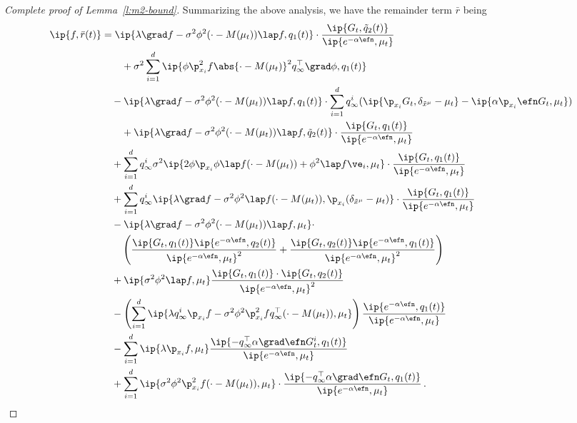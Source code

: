 \documentclass{amsart}
\begin{document}
\begin{proof}[Complete proof of Lemma~\ref{l:m2-bound}]
	Summarizing the above analysis, we have the remainder term $\bar r$ being 
	\begin{align*}
		\ip{f, \bar r(t)} & = \ip{\lambda \grad f - \sigma^2 \phi^2 (\cdot-M(\mu_t)) \lap f, q_1(t)} \cdot \frac{\ip{G_t, \tilde q_2(t)}}{\ip{e^{-\alpha\efn}, \mu_t}} \\
		& \qquad + \sigma^2 \sum_{i=1}^d \ip{\phi \p_{x_i}^2 f \abs{\cdot-M(\mu_t)}^2 q_\infty^\top \grad \phi, q_1(t)} \\
		& \quad - \ip{\lambda \grad f - \sigma^2 \phi^2 (\cdot-M(\mu_t)) \lap f, q_1(t)} \cdot \sum_{i=1}^d q_\infty^i (\ip{\p_{x_i} G_t, \delta_{\tilde x^\mu} - \mu_t} - \ip{\alpha \p_{x_i} \efn G_t, \mu_t})  \\
		& \qquad + \ip{\lambda \grad f - \sigma^2 \phi^2 (\cdot-M(\mu_t)) \lap f, \tilde q_2(t)} \cdot \frac{\ip{G_t, q_1(t)}}{\ip{e^{-\alpha\efn}, \mu_t}} \\
		& \quad + \sum_{i=1}^d q_\infty^i \sigma^2 \ip{ 2 \phi \p_{x_i} \phi \lap f (\cdot-M(\mu_t)) + \phi^2 \lap f \ve_i, \mu_t } \cdot \frac{\ip{G_t, q_1(t)}}{\ip{e^{-\alpha\efn}, \mu_t}} \\
		& \quad + \sum_{i=1}^d q_\infty^i \ip{\lambda \grad f - \sigma^2 \phi^2 \lap f (\cdot-M(\mu_t)), \p_{x_i} (\delta_{\tilde x^\mu} - \mu_t)} \cdot \frac{\ip{G_t, q_1(t)}}{\ip{e^{-\alpha\efn}, \mu_t}} \\
		& \quad - \ip {\lambda \grad f - \sigma^2 \phi^2 (\cdot-M(\mu_t)) \lap f, \mu_t} \cdot \\ 
		& \qquad \left( \frac{ \ip{G_t, q_1(t)} \ip{e^{-\alpha\efn}, q_2(t)} }{ \ip{e^{-\alpha\efn},\mu_t}^2 } +  \frac{ \ip{G_t, q_2(t)} \ip{e^{-\alpha\efn}, q_1(t)} }{ \ip{e^{-\alpha\efn},\mu_t}^2 } \right) \\
		& \quad + \ip{ \sigma^2 \phi^2 \lap f, \mu_t} \frac{ \ip{G_t, q_1(t)} \cdot \ip{G_t, q_2(t)} }{ \ip{e^{-\alpha\efn},\mu_t}^2 } \\
		& \quad - \left( \sum_{i=1}^d  \ip{\lambda q_\infty^i \p_{x_i} f - \sigma^2 \phi^2 \p_{x_i}^2 f q_\infty^\top (\cdot-M(\mu_t)),\mu_t} \right) \frac{\ip{e^{-\alpha\efn}, q_1(t)}}{\ip{e^{-\alpha\efn}, \mu_t}} \\
		& \quad - \sum_{i=1}^d \ip{\lambda \p_{x_i}f , \mu_t }  \frac{\ip{- q_\infty^\top \alpha \grad \efn G_t^i, q_1(t)}}{\ip{e^{-\alpha\efn},\mu_t}} \\
		& \quad + \sum_{i=1}^d \ip{\sigma^2 \phi^2 \p_{x_i}^2 f (\cdot-M(\mu_t)), \mu_t} \cdot \frac{\ip{- q_\infty^\top \alpha \grad \efn G_t, q_1(t)}}{\ip{e^{-\alpha\efn},\mu_t}}  \,.
	\end{align*}


\end{proof}
\end{document}
